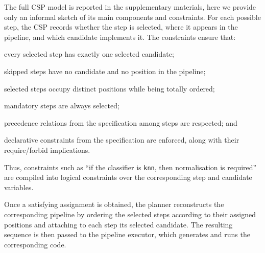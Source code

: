 \documentclass[runningheads]{llncs}
\newenvironment{inlinelist}{\begin{enumerate*}[label=\emph{(\roman*)}]}{\end{enumerate*}}
\begin{document}
The full \ac{CSP} model is reported in the supplementary materials,
here we provide only an informal sketch of its main components and constraints.
%
For each possible step,
the \ac{CSP} records whether the step is selected,
where it appears in the pipeline,
and which candidate implements it.
%
The constraints ensure that:
%
\begin{inlinelist}
  \item every selected step has exactly one selected candidate;
  \item skipped steps have no candidate and no position in the pipeline;
  \item selected steps occupy distinct positions while being totally ordered;
  \item mandatory steps are always selected;
  \item precedence relations from the specification among steps are respected;
  and
  \item declarative constraints from the specification are enforced,
  along with their require/forbid implications.
\end{inlinelist}
%
Thus,
constraints such as
``if the classifier is \texttt{knn}, then normalisation is required''
are compiled into logical constraints over the corresponding step and candidate variables.


Once a satisfying assignment is obtained,
the planner reconstructs the corresponding pipeline by ordering the selected steps according to their assigned positions
and attaching to each step its selected candidate.
%
The resulting sequence is then passed to the pipeline executor,
which generates and runs the corresponding code.
\end{document}
